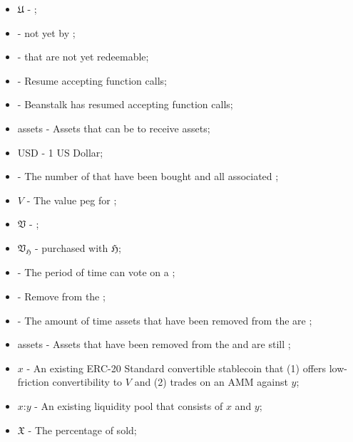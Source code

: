 \documentclass[class=article, crop=false]{standalone}
\begin{document}
\begin{itemize}[topsep=0pt, itemsep=3pt,leftmargin=16pt]
    \item[] $\mathfrak{U}$ - \hypertarget{ht209}{ };
    \item[]  - \hypertarget{ht210}{ not yet  by };
    \item[]  - \hypertarget{ht211}{ that are not yet redeemable};
    \item[]  - \hypertarget{ht212}{Resume accepting  function calls};
    \item[]  - \hypertarget{ht213}{Beanstalk has resumed accepting  function calls};
    \item[]  assets - \hypertarget{ht214}{Assets that can be  to receive  assets};
    \item[] USD - 1 US Dollar;
    \item[]  - \hypertarget{ht215}{The number of  that have been bought and  all associated };
    \item[] $V$ - \hypertarget{ht216}{The value peg for };
    \item[] $\mathfrak{V}$ - \hypertarget{ht217}{};
    \item[] $\mathfrak{V}_\mathfrak{H}$ - \hypertarget{ht218}{ purchased with  $\mathfrak{H}$};
    \item[]  - \hypertarget{ht219}{The period of time  can vote on a };
    \item[]  - \hypertarget{ht220}{Remove from the };
    \item[]  - \hypertarget{ht221}{The amount of time assets that have been removed from the  are };
    \item[]  assets - \hypertarget{ht222}{Assets that have been removed from the  and are still };
    \item[] $x$ - \hypertarget{ht223}{An existing ERC-20 Standard convertible stablecoin that (1) offers low-friction convertibility to $V$ and (2) trades on an AMM against $y$};
    \item[] $x$:$y$ - \hypertarget{ht224}{An existing liquidity pool that consists of $x$ and $y$};
    \item[] $\mathfrak{X}$ - \hypertarget{ht225}{The percentage of  sold};

\end{itemize}
\end{document}
